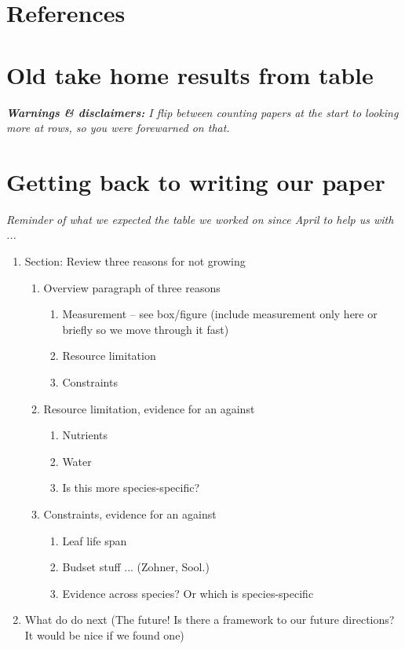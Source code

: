 \documentclass[11pt]{article}
\begin{document}
\clearpage
\section{References}



\clearpage

\section{Old take home results from table}

\emph{{\bf Warnings \& disclaimers:}
I flip between counting papers at the start to looking more at rows, so you were forewarned on that. }




\section{Getting back to writing our paper}

\emph{Reminder of what we expected the table we worked on since April to help us with ...}
\begin{enumerate}
\item Section: Review three reasons for not growing 
\begin{enumerate} 
\item Overview paragraph of three reasons
\begin{enumerate} 
\item Measurement -- see box/figure  (include measurement only here or briefly so we move through it fast)
\item Resource limitation
\item Constraints
\end{enumerate}
\item Resource limitation, evidence for an against 
\begin{enumerate}
\item Nutrients
\item Water
\item Is this more species-specific?
\end{enumerate}
\item Constraints, evidence for an against 
\begin{enumerate}
\item Leaf life span
\item Budset stuff ... (Zohner, Sool.)
\item Evidence across species? Or which is species-specific
\end{enumerate}
\end{enumerate}
\item What do do next (The future! Is there a framework to our future directions? It would be nice if we found one) 
\end{enumerate}
\end{document}
